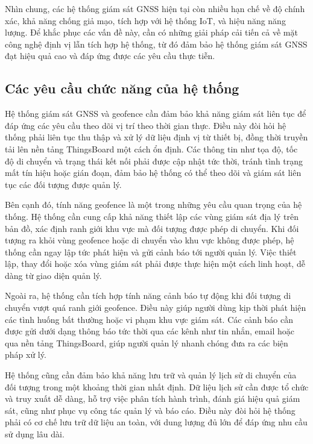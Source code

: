\documentclass[../DoAn.tex]{subfiles}
\begin{document}
Nhìn chung, các hệ thống giám sát GNSS hiện tại còn nhiều hạn chế về độ chính xác, khả năng chống giả mạo, tích hợp với hệ thống IoT, và hiệu năng năng lượng. Để khắc phục các vấn đề này, cần có những giải pháp cải tiến cả về mặt công nghệ định vị lẫn tích hợp hệ thống, từ đó đảm bảo hệ thống giám sát GNSS đạt hiệu quả cao và đáp ứng được các yêu cầu thực tiễn.
\subsection{Các yêu cầu chức năng của hệ thống}
\label{subsection:2.1.2}
Hệ thống giám sát GNSS và geofence cần đảm bảo khả năng giám sát liên tục để đáp ứng các yêu cầu theo dõi vị trí theo thời gian thực. Điều này đòi hỏi hệ thống phải liên tục thu thập và xử lý dữ liệu định vị từ thiết bị, đồng thời truyền tải lên nền tảng ThingsBoard một cách ổn định. Các thông tin như tọa độ, tốc độ di chuyển và trạng thái kết nối phải được cập nhật tức thời, tránh tình trạng mất tín hiệu hoặc gián đoạn, đảm bảo hệ thống có thể theo dõi và giám sát liên tục các đối tượng được quản lý.

Bên cạnh đó, tính năng geofence là một trong những yêu cầu quan trọng của hệ thống. Hệ thống cần cung cấp khả năng thiết lập các vùng giám sát địa lý trên bản đồ, xác định ranh giới khu vực mà đối tượng được phép di chuyển. Khi đối tượng ra khỏi vùng geofence hoặc di chuyển vào khu vực không được phép, hệ thống cần ngay lập tức phát hiện và gửi cảnh báo tới người quản lý. Việc thiết lập, thay đổi hoặc xóa vùng giám sát phải được thực hiện một cách linh hoạt, dễ dàng từ giao diện quản lý.

Ngoài ra, hệ thống cần tích hợp tính năng cảnh báo tự động khi đối tượng di chuyển vượt quá ranh giới geofence. Điều này giúp người dùng kịp thời phát hiện các tình huống bất thường hoặc vi phạm khu vực giám sát. Các cảnh báo cần được gửi dưới dạng thông báo tức thời qua các kênh như tin nhắn, email hoặc qua nền tảng ThingsBoard, giúp người quản lý nhanh chóng đưa ra các biện pháp xử lý.

Hệ thống cũng cần đảm bảo khả năng lưu trữ và quản lý lịch sử di chuyển của đối tượng trong một khoảng thời gian nhất định. Dữ liệu lịch sử cần được tổ chức và truy xuất dễ dàng, hỗ trợ việc phân tích hành trình, đánh giá hiệu quả giám sát, cũng như phục vụ công tác quản lý và báo cáo. Điều này đòi hỏi hệ thống phải có cơ chế lưu trữ dữ liệu an toàn, với dung lượng đủ lớn để đáp ứng nhu cầu sử dụng lâu dài.
\end{document}
